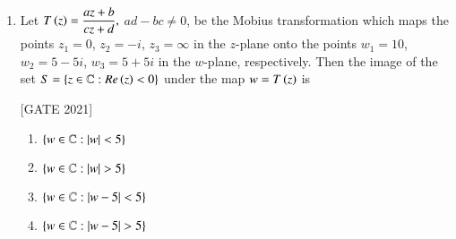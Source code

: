 \documentclass[journal,12pt,onecolumn]{IEEEtran}
\theoremstyle{remark}
\begin{document}
\begin{enumerate}
\item 
Let $ T\left(z\right) = \dfrac{az + b}{cz   + d},$   $ad - bc \neq 0 $, be the Mobius transformation which maps the points $ z_1 = 0   $, $ z_2 = -i $, $ z_3 = \infty $ in the $ z  $-plane onto the points $   w_1 =   10 $, $ w_2 =5 - 5i $, $ w_3 =5 + 5i $ in the $ w   $-plane, respectively. Then the image of the set $ S   = \left\{  z \in \mathbb{C} : Re\left(z\right) < 0 \right\} $ under the map $ w   = T\left(z\right) $ is

\hfill{[GATE 2021]}\begin{multicols}{2}
    \begin{enumerate}
        \item $ \left\{  w \in \mathbb{C} : |w| < 5 \right\} $
        \item $ \left\{w\in \mathbb{C} : |w| > 5 \right\} $\item $ \left\{w \in \mathbb{C} : |w - 5| < 5 \right\} $\item $ \left\{ w \in \mathbb{C} : |w - 5| > 5 \right\} $
    \end{enumerate}
\end{multicols}

\end{enumerate}
\end{document}
